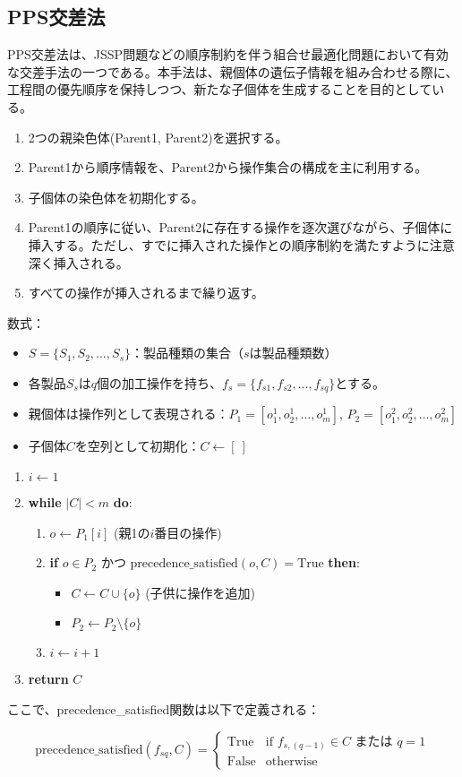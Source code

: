 \documentclass{jarticle}
\begin{document}
\subsection{PPS交差法}
PPS交差法は、JSSP問題などの順序制約を伴う組合せ最適化問題において有効な交差手法の一つである。本手法は、親個体の遺伝子情報を組み合わせる際に、工程間の優先順序を保持しつつ、新たな子個体を生成することを目的としている。
\begin{enumerate}
    \item 2つの親染色体(Parent1, Parent2)を選択する。
    \item Parent1から順序情報を、Parent2から操作集合の構成を主に利用する。
    \item 子個体の染色体を初期化する。
    \item Parent1の順序に従い、Parent2に存在する操作を逐次選びながら、子個体に挿入する。ただし、すでに挿入された操作との順序制約を満たすように注意深く挿入される。
    \item すべての操作が挿入されるまで繰り返す。
    \end{enumerate}
数式：
\begin{itemize}
    \item $S = \{S_1, S_2, \dots, S_s\}$：製品種類の集合（$s$は製品種類数）
    \item 各製品$S_s$は$q$個の加工操作を持ち、$f_s = \{f_{s1}, f_{s2}, \dots, f_{sq}\}$とする。
    \item 親個体は操作列として表現される：$P_1 = [o_1^1, o_2^1, \dots, o_m^1]$, $P_2 = [o_1^2, o_2^2, \dots, o_m^2]$
    \item 子個体$C$を空列として初期化：$C \leftarrow [\ ]$
    \end{itemize}

\begin{enumerate}
    \item $i \leftarrow 1$
    \item \textbf{while} $|C| < m$ \textbf{do}:
    \begin{enumerate}
        \item $o \leftarrow P_1[i]$ (親1の$i$番目の操作)
        \item \textbf{if} $o \in P_2$ かつ $\text{precedence\_satisfied}(o, C) = \text{True}$ \textbf{then}:
        \begin{itemize}
        \item $C \leftarrow C \cup \{o\}$ (子供に操作を追加)
        \item $P_2 \leftarrow P_2 \setminus \{o\}$
        \end{itemize}
        \item $i \leftarrow i + 1$
    \end{enumerate}
    \item \textbf{return} $C$
    \end{enumerate}

ここで、precedence\_satisfied関数は以下で定義される：

\[
\text{precedence\_satisfied}(f_{sq}, C) =
\begin{cases}
    \text{True} & \text{if } f_{s,(q-1)} \in C \text{ または } q = 1 \\
    \text{False} & \text{otherwise}
\end{cases}
\]
    
\end{document}
